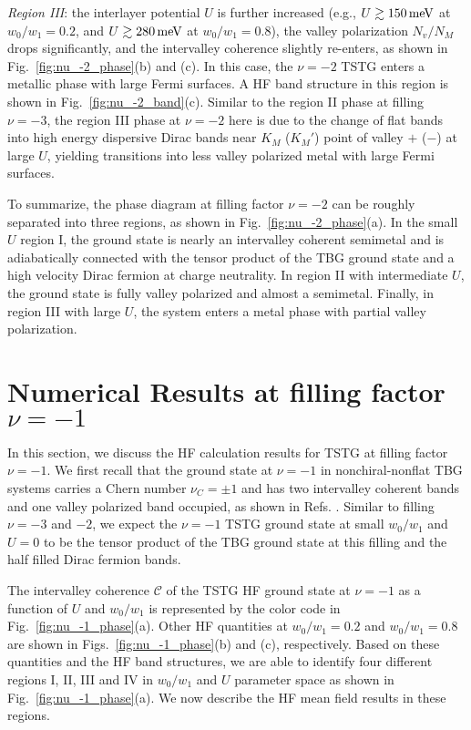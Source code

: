 \documentclass[prb,aps,nofootinbib,amssymb,twocolumn,superscriptaddress,10pt]{revtex4-2}
\begin{document}
{\it Region III}: the interlayer potential $U$ is further increased (e.g., $U \gtrsim 150\,\rm meV$ at $w_0/w_1=0.2$, and $U \gtrsim 280\,\rm meV$ at $w_0/w_1 = 0.8$), the valley polarization $N_v/N_M$ drops significantly, and the intervalley coherence slightly re-enters, as shown in Fig.~\ref{fig:nu_-2_phase}(b) and (c). In this case, the $\nu=-2$ TSTG enters a metallic phase with large Fermi surfaces. A HF band structure in this region is shown in Fig.~\ref{fig:nu_-2_band}(c). Similar to the region II phase at filling $\nu=-3$, the region III phase at $\nu=-2$ here is due to the change of flat bands into high energy dispersive Dirac bands near $K_M$ ($K_M'$) point of valley $+$ ($-$) at large $U$, yielding transitions into less valley polarized metal with large Fermi surfaces.

To summarize, the phase diagram at filling factor $\nu=-2$ can be roughly separated into three regions, as shown in Fig.~\ref{fig:nu_-2_phase}(a). In the small $U$ region I, the ground state is nearly an intervalley coherent semimetal and is adiabatically connected with the tensor product of the TBG ground state and a high velocity Dirac fermion at charge neutrality. In region II with intermediate $U$, the ground state is fully valley polarized and almost a semimetal. Finally, in region III with large $U$, the system enters a metal phase with partial valley polarization.


\section{Numerical Results at filling factor \texorpdfstring{$\nu=-1$}{nu=-1}}\label{sec:nu_-1}
In this section, we discuss the HF calculation results for TSTG at filling factor $\nu=-1$. We first recall that the ground state at $\nu=-1$ in nonchiral-nonflat TBG systems carries a Chern number $\nu_C = \pm 1$ and has two intervalley coherent bands and one valley polarized band occupied, as shown in Refs. \cite{LIA20,ZHA20}. Similar to filling $\nu=-3$ and $-2$, we expect the $\nu=-1$ TSTG ground state at small $w_0/w_1$ and $U=0$ to be the tensor product of the TBG ground state at this filling and the half filled Dirac fermion bands. 


The intervalley coherence $\mathcal{C}$ of the TSTG HF ground state at $\nu=-1$ as a function of $U$ and $w_0/w_1$ is represented by the color code in Fig.~\ref{fig:nu_-1_phase}(a). Other HF quantities at $w_0/w_1 = 0.2$ and $w_0/w_1 = 0.8$ are shown in Figs.~\ref{fig:nu_-1_phase}(b) and (c), respectively. Based on these quantities and the HF band structures, we are able to identify four different regions I, II, III and IV in $w_0/w_1$ and $U$ parameter space as shown in Fig.~\ref{fig:nu_-1_phase}(a). We now describe the HF mean field results in these regions.
\end{document}
